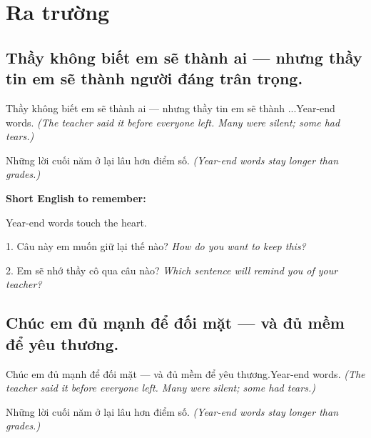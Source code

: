 \chapter{Ra trường}


\section{Thầy không biết em sẽ thành ai — nhưng thầy tin em sẽ thành người đáng trân trọng.}
\begin{truyen}{Thầy không biết em sẽ thành ai — nhưng thầy tin em sẽ thành ...}{Year-end words.}
\textit{(The teacher said it before everyone left. Many were silent; some had tears.)}
\end{truyen}

\begin{baihoc}
Những lời cuối năm ở lại lâu hơn điểm số.
\textit{(Year-end words stay longer than grades.)}
\end{baihoc}

\begin{ghinhoanh}
\textbf{Short English to remember:}

Year-end words touch the heart.

\end{ghinhoanh}

\begin{tuhocnhanh}
1. Câu này em muốn giữ lại thế nào? \textit{How do you want to keep this?}

2. Em sẽ nhớ thầy cô qua câu nào? \textit{Which sentence will remind you of your teacher?}
\end{tuhocnhanh}
\ngancach


\section{Chúc em đủ mạnh để đối mặt — và đủ mềm để yêu thương.}
\begin{truyen}{Chúc em đủ mạnh để đối mặt — và đủ mềm để yêu thương.}{Year-end words.}
\textit{(The teacher said it before everyone left. Many were silent; some had tears.)}
\end{truyen}

\begin{baihoc}
Những lời cuối năm ở lại lâu hơn điểm số.
\textit{(Year-end words stay longer than grades.)}
\end{baihoc}

